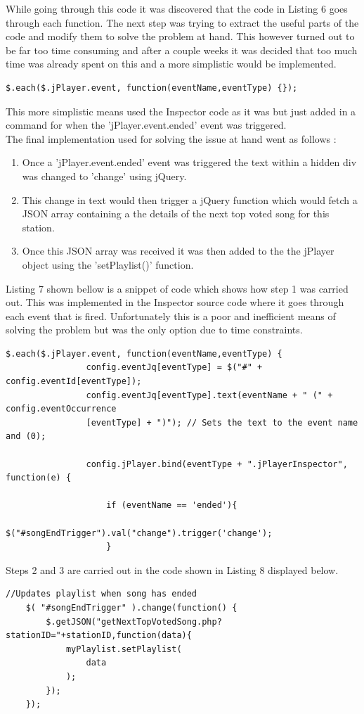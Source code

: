 \documentclass[a4paper, 12pt]{report}
\begin{document}
While going through this code it was discovered that the code in Listing 6 goes through each function. The next step was trying to extract the useful parts of the code and modify them to solve the problem at hand. This however turned out to be far too time consuming and after a couple weeks it was decided that too much time was already spent on this and a more simplistic would be implemented. 

\begin{lstlisting}[caption=Function in Inspector used to go through events]
$.each($.jPlayer.event, function(eventName,eventType) {});
\end{lstlisting}

This more simplistic means used the Inspector code as it was but just added in a command for when the 'jPlayer.event.ended' event was triggered.\\
The final implementation used for solving the issue at hand went as follows : 
\begin{enumerate}
\item Once a 'jPlayer.event.ended' event was triggered the text within a hidden div was changed to 'change' using jQuery.
\item This change in text would then trigger a jQuery function which would fetch a JSON array containing a the details of the next top voted song for this station.
\item Once this JSON array was received it was then added to the the jPlayer object using the 'setPlaylist()' function. 
\end{enumerate}
Listing 7 shown bellow is a snippet of code which shows how step 1 was carried out. This was implemented in the Inspector source code where it goes through each event that is fired. Unfortunately this is a poor and inefficient means of solving the problem but was the only option due to time constraints.
\begin{lstlisting}[caption=Updating div when 'ended' event is triggered]
$.each($.jPlayer.event, function(eventName,eventType) {
				config.eventJq[eventType] = $("#" + config.eventId[eventType]);
				config.eventJq[eventType].text(eventName + " (" + config.eventOccurrence
				[eventType] + ")"); // Sets the text to the event name and (0);
				
				config.jPlayer.bind(eventType + ".jPlayerInspector", function(e) {
					
					if (eventName == 'ended'){
						$("#songEndTrigger").val("change").trigger('change');
					}	
\end{lstlisting}
Steps 2 and 3 are carried out in the code shown in Listing 8 displayed below. 
\begin{lstlisting}[caption=Fetches the playlist containing the next top voted song]
//Updates playlist when song has ended
	$( "#songEndTrigger" ).change(function() {
		$.getJSON("getNextTopVotedSong.php?stationID="+stationID,function(data){
			myPlaylist.setPlaylist(
				data
			);
		});
	});
\end{lstlisting}
\end{document}
